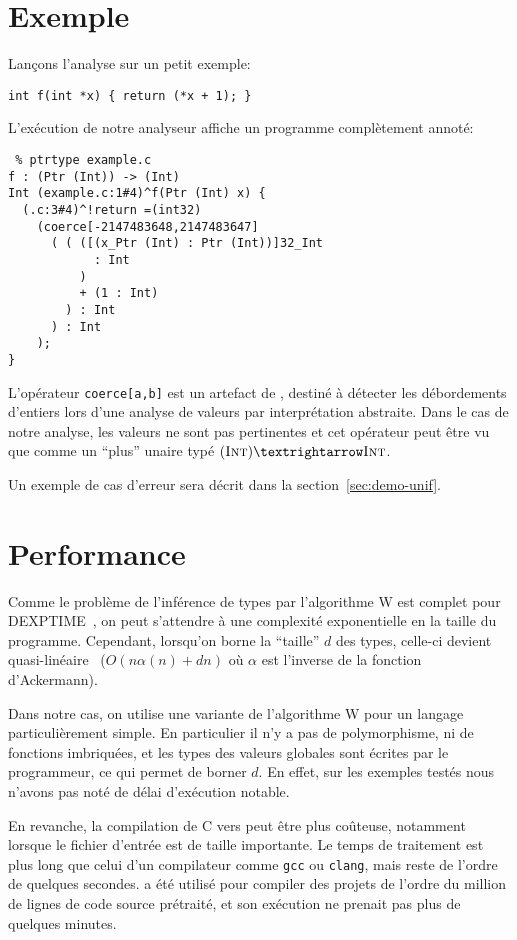 \section{Exemple}

Lançons l'analyse sur un petit exemple:

\begin{verbatim}
int f(int *x) { return (*x + 1); }
\end{verbatim}

L'exécution de notre analyseur affiche un programme complètement annoté:

\begin{verbatim}
 % ptrtype example.c
f : (Ptr (Int)) -> (Int)
Int (example.c:1#4)^f(Ptr (Int) x) {
  (.c:3#4)^!return =(int32)
    (coerce[-2147483648,2147483647]
      ( ( ([(x_Ptr (Int) : Ptr (Int))]32_Int
            : Int
          )
          + (1 : Int)
        ) : Int
      ) : Int
    );
}
\end{verbatim}

L'opérateur \texttt{coerce[a,b]} est un artefact de \newspeak, destiné à
détecter les débordements d'entiers lors d'une analyse de valeurs par
interprétation abstraite. Dans le cas de notre analyse, les valeurs ne sont pas
pertinentes et cet opérateur peut être vu que comme un \enquote{plus} unaire
typé $(\tInt) → \tInt$.

Un exemple de cas d'erreur sera décrit dans la section~\ref{sec:demo-unif}.

\section{Performance}

Comme le problème de l'inférence de types par l'algorithme W est complet pour
DEXPTIME~\cite{mairson}, on peut s'attendre à une complexité exponentielle en la
taille du programme. Cependant, lorsqu'on borne la \enquote{taille} $d$ des
types, celle-ci devient quasi-linéaire~\cite{rta03} ($O(n α(n) + dn)$ où $α$ est
l'inverse de la fonction d'Ackermann).

Dans notre cas, on utilise une variante de l'algorithme W pour un langage
particulièrement simple. En particulier il n'y a pas de polymorphisme, ni de
fonctions imbriquées, et les types des valeurs globales sont écrites par le
programmeur, ce qui permet de borner $d$. En effet, sur les exemples testés nous
n'avons pas noté de délai d'exécution notable.

En revanche, la compilation de C vers \newspeak peut être plus coûteuse,
notamment lorsque le fichier d'entrée est de taille importante. Le temps de
traitement est plus long que celui d'un compilateur comme \texttt{gcc} ou
\texttt{clang}, mais reste de l'ordre de quelques secondes. \ctonewspeak a été
utilisé pour compiler des projets de l'ordre du million de lignes de code source
prétraité, et son exécution ne prenait pas plus de quelques minutes.


